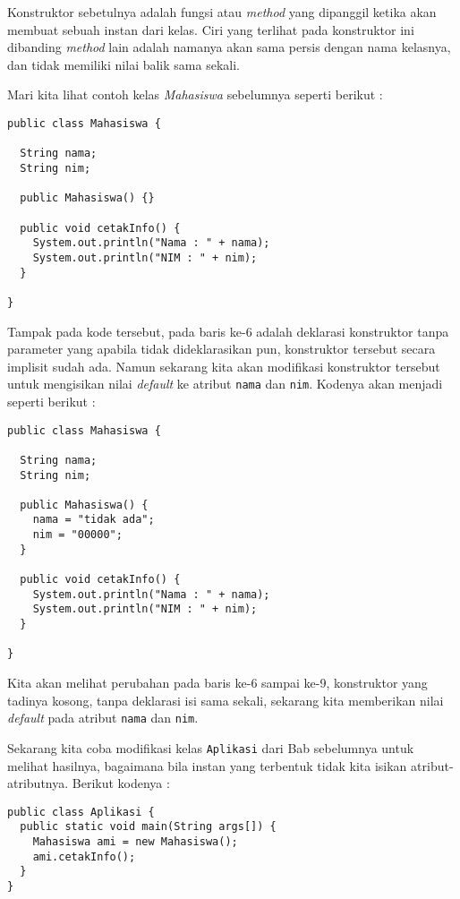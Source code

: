 Konstruktor sebetulnya adalah fungsi atau \textit{method} yang dipanggil ketika akan membuat sebuah instan dari kelas. Ciri yang terlihat pada konstruktor ini dibanding \textit{method} lain adalah namanya akan sama persis dengan nama kelasnya, dan tidak memiliki nilai balik sama sekali.

Mari kita lihat contoh kelas \textit{Mahasiswa} sebelumnya seperti berikut :

\begin{lstlisting}
public class Mahasiswa {

  String nama;
  String nim;
  
  public Mahasiswa() {}
  
  public void cetakInfo() {
    System.out.println("Nama : " + nama);
    System.out.println("NIM : " + nim);
  }

}
\end{lstlisting}

Tampak pada kode tersebut, pada baris ke-6 adalah deklarasi konstruktor tanpa parameter yang apabila tidak dideklarasikan pun, konstruktor tersebut secara implisit sudah ada. Namun sekarang kita akan modifikasi konstruktor tersebut untuk mengisikan nilai \textit{default} ke atribut \texttt{nama} dan \texttt{nim}. Kodenya akan menjadi seperti berikut :

\begin{lstlisting}
public class Mahasiswa {

  String nama;
  String nim;
  
  public Mahasiswa() {
    nama = "tidak ada";
    nim = "00000";
  }
  
  public void cetakInfo() {
    System.out.println("Nama : " + nama);
    System.out.println("NIM : " + nim);
  }

}
\end{lstlisting}

Kita akan melihat perubahan pada baris ke-6 sampai ke-9, konstruktor yang tadinya kosong, tanpa deklarasi isi sama sekali, sekarang kita memberikan nilai \textit{default} pada atribut \texttt{nama} dan \texttt{nim}.

Sekarang kita coba modifikasi kelas \texttt{Aplikasi} dari Bab sebelumnya untuk melihat hasilnya, bagaimana bila instan yang terbentuk tidak kita isikan atribut-atributnya. Berikut kodenya :

\begin{lstlisting}
public class Aplikasi {
  public static void main(String args[]) {
    Mahasiswa ami = new Mahasiswa();
    ami.cetakInfo();
  }
}
\end{lstlisting}

